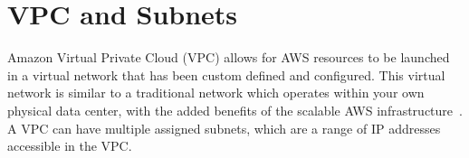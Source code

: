 \chapter{VPC and Subnets}\label{ch:vpc_subnets}

Amazon Virtual Private Cloud (VPC) allows for AWS resources to be launched in a virtual network that has been custom
defined and configured.
This virtual network is similar to a traditional network which operates within your own physical data center, with the
added benefits of the scalable AWS infrastructure~\citep{amazon2022what}.
A VPC can have multiple assigned subnets, which are a range of IP addresses accessible in the VPC\@.


